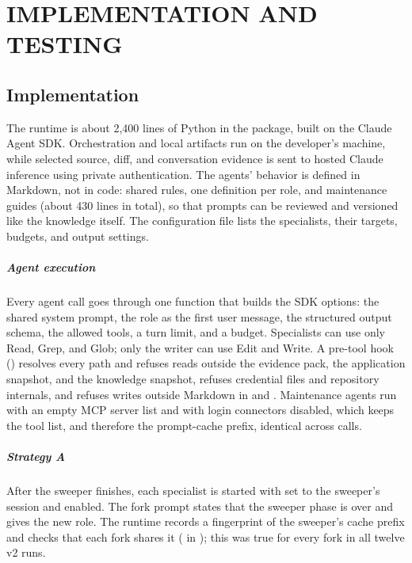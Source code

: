 \chapter{IMPLEMENTATION AND TESTING}

\section{Implementation}

The runtime is about 2{,}400 lines of Python in the  package, built on the Claude Agent SDK. Orchestration and local artifacts run on the developer's machine, while selected source, diff, and conversation evidence is sent to hosted Claude inference using private authentication. The agents' behavior is defined in Markdown, not in code: shared rules, one definition per role, and maintenance guides (about 430 lines in total), so that prompts can be reviewed and versioned like the knowledge itself. The configuration file  lists the specialists, their targets, budgets, and output settings.

\paragraph{Agent execution} Every agent call goes through one function that builds the SDK options: the shared system prompt, the role as the first user message, the structured output schema, the allowed tools, a turn limit, and a budget. Specialists can use only Read, Grep, and Glob; only the writer can use Edit and Write. A pre-tool hook () resolves every path and refuses reads outside the evidence pack, the application snapshot, and the knowledge snapshot, refuses credential files and repository internals, and refuses writes outside Markdown in  and . Maintenance agents run with an empty MCP server list and with login connectors disabled, which keeps the tool list, and therefore the prompt-cache prefix, identical across calls.

\paragraph{Strategy A} After the sweeper finishes, each specialist is started with  set to the sweeper's session and  enabled. The fork prompt states that the sweeper phase is over and gives the new role. The runtime records a fingerprint of the sweeper's cache prefix and checks that each fork shares it ( in ); this was true for every fork in all twelve v2 runs.

